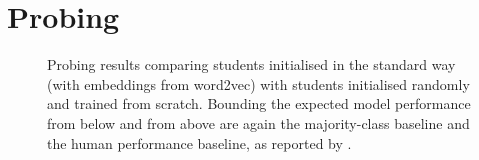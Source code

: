 \documentclass[bsc,frontabs,singlespacing,parskip,deptreport]{infthesis}
\begin{document}
\chapter{Probing}{
  \label{chap:A-probing}
  \begin{figure}[h!tb]
    \centering
    \caption{Probing results comparing students initialised in the standard way (with embeddings from word2vec) with students initialised randomly and trained from scratch. Bounding the expected model performance from below and from above are again the majority-class baseline and the human performance baseline, as reported by \citet{Conneau_2018}.}
    \label{fig:probing-students-scratch}
  \end{figure}
}
\end{document}
